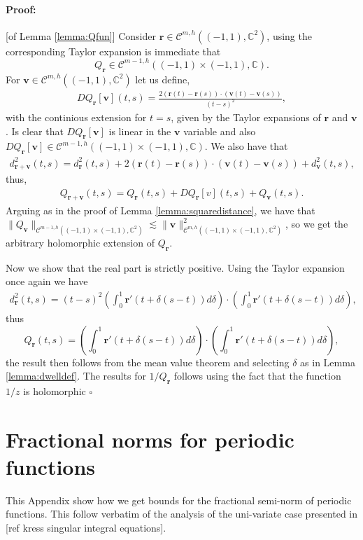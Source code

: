 \documentclass{article}
\newenvironment{proof}{\paragraph{Proof:}}{\hfill$\square$}
\newcommand{\todo}[1]{{\color{red}[#1]}}
\newcommand{\IC}{{\mathbb C}}
\newcommand{\cmspaceh}[4]{\mathcal{C}^{#1,#2} \left( #3, #4 \right)}
\newcommand{\bv}{\bm{v}}
\newcommand{\br}{\bm{r}}
\newcommand{\iinterv}{(-1,1)\times(-1,1)}
\begin{document}
\begin{proof}[of Lemma \ref{lemma:Qfun}]
Consider $\br \in \cmspaceh{m}{h}{(-1,1)}{\IC^2}$, using the corresponding Taylor expansion is immediate that  $$Q_{\br} \in \cmspaceh{m-1}{h}{(-1,1)\times(-1,1)}{\IC}.$$  For $\bv \in \cmspaceh{m}{h}{(-1,1)}{\IC^2}$ let us define,
\begin{align*}
DQ_{\br}[\bv](t,s) = \frac{2 (\br(t)-\br(s))\cdot (\bv(t)-\bv(s))}{(t-s)^2}, 
\end{align*}
with the continious extension for $t=s$, given by the Taylor expansions of $\br$ and $\bv$. Is clear that $DQ_{\br}[\bv]$ is linear in the $\bv$ variable and also $DQ_{\br}[\bv] \in \cmspaceh{m-1}{h}{(-1,1)\times(-1,1)}{\IC}$. We also have that 
\begin{align*}
d_{\br +\bv}^2(t,s) = d^2_{\br}(t,s) + 2 (\br(t) -\br(s))\cdot (\bv(t)-\bv(s)) + d_{\bv}^2(t,s),
\end{align*}
thus, 
\begin{align*}
Q_{\br +\bv}(t,s) = Q_{\br}(t,s) + DQ_{\br}[v](t,s) + Q_{\bv}(t,s).
\end{align*}
Arguing as in the proof of Lemma \ref{lemma:squaredistance}, 
we have that $\| Q_{\bv}\|_{\cmspaceh{m-1}{h}{\iinterv}{\IC^2}} \lesssim \| \bv\|_{\cmspaceh{m}{h}{\iinterv}{\IC^2}}^2$, so we get the arbitrary holomorphic extension of $Q_{\br}$.

Now we show that the real part is strictly positive. Using the Taylor expansion once again we have 
\begin{align*}
d_{\br}^2(t,s) = (t-s)^2 \left(\int_{0}^1 \br'(t+\delta(s-t))d\delta \right) \cdot \left(\int_{0}^1 \br'(t+\delta(s-t))d\delta \right),
\end{align*}
thus 
$$
Q_{\br}(t,s) = \left(\int_{0}^1 \br'(t+\delta(s-t))d\delta \right) \cdot \left(\int_{0}^1 \br'(t+\delta(s-t))d\delta \right),
$$
the result then follows from the mean value theorem and selecting $\delta$ as in Lemma \ref{lemma:dwelldef}. The results for $1/Q_{\br}$  follows using the fact that the function $1/z$ is holomorphic 
\end{proof}

\section{Fractional norms for periodic functions}
\label{appendix:fracbivariate}
This Appendix show how we get bounds for the fractional semi-norm of periodic functions. This follow verbatim of the analysis of the uni-variate case presented in \todo{ref kress singular integral equations}. 
\end{document}
